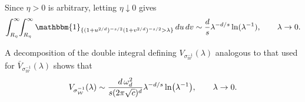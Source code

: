 \documentclass[a4paper,12pt]{article}
\let\originalleft\left
\let\originalright\right
\renewcommand{\left}{\mathopen{}\mathclose\bgroup\originalleft}
\renewcommand{\right}{\aftergroup\egroup\originalright}
\newcommand{\symbolnotsobw}{\symbolnot_{\mathcal{W}}}
\newcommand{\symbolnot}{\sigma}
\begin{document}
Since $\eta>0$ is arbitrary, letting $\eta\downarrow0$ gives
\begin{equation}\label{eq:limit-double-int-simple-form-2}
\int_{R_\eta}^{\infty}\!\!\int_{R_\eta}^{\infty}
\mathbbm{1}_{\{(1+u^{2/d})^{-s/2}(1+v^{2/d})^{-s/2}>\lambda\}}
\,du\,dv
\sim
\frac{d}{s}\lambda^{-d/s}\ln(\lambda^{-1}),
\qquad \lambda\to0.
\end{equation}

A decomposition of the double integral defining $V_{\symbolnotsobw^{-1}}(\lambda)$
analogous to that used for $\bar V_{\symbolnotsobw^{-1}}(\lambda)$ shows that 
\begin{equation}\label{eq:asymp-vol-case-r-equals-s}
V_{\symbolnotsobw^{-1}}(\lambda)
\sim
\frac{d\,\omega_d^2}{s(2\pi\sqrt{c})^{d}}
\lambda^{-d/s}\ln \left(\lambda^{-1}\right),
\qquad \lambda\to0 .
\end{equation}
\end{document}
